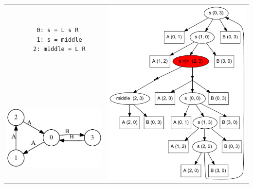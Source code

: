 \documentclass{article} %
\begin{document}
\pagestyle{empty}


\begin{table}
\begin{center}
\begin{tabular}{c c}

\begin{minipage}{0.4\textwidth}

{\Huge
\begin{verbatim}
   0: s = L s R 
   1: s = middle
   2: middle = L R



\end{verbatim}
      }
\end{minipage}
&
\multirow{2}{*}{
\begin{minipage}{0.6\textwidth}
\vspace{-5cm}
        \includegraphics[width=13cm]{dot/AnBn.pdf}
\end{minipage}
}
\\
\begin{minipage}{0.4\textwidth}
    \includegraphics[width=8cm]{dot/input.pdf}
\end{minipage}
\end{tabular}
\end{center}
\end{table}


%
%
%
%

%
%
\end{document}
